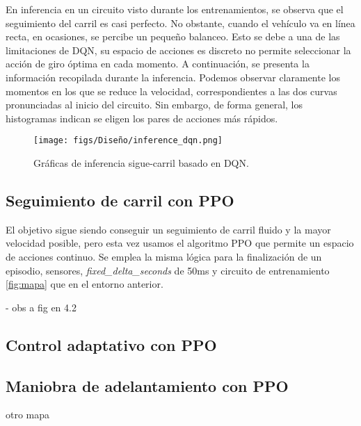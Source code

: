 En inferencia en un circuito visto durante los entrenamientos, se observa que el seguimiento del carril es casi perfecto. No obstante, cuando el vehículo va en línea recta, en ocasiones, se percibe un pequeño balanceo. Esto se debe a una de las limitaciones de \ac{DQN}, su espacio de acciones es discreto no permite seleccionar la acción de giro óptima en cada momento. A continuación, se presenta la información recopilada durante la inferencia. Podemos observar claramente los momentos en los que se reduce la velocidad, correspondientes a las dos curvas pronunciadas al inicio del circuito. Sin embargo, de forma general, los histogramas indican se eligen los pares de acciones más rápidos.
\begin{figure}[ht]
  \centering
  \texttt{[image: figs/Diseño/inference\_dqn.png]}
  \caption{Gráficas de inferencia sigue-carril basado en \ac{DQN}.}
  \label{fig:inference_dqn}
\end{figure}

\subsection{Seguimiento de carril con PPO}

El objetivo sigue siendo conseguir un seguimiento de carril fluido y la mayor velocidad posible, pero esta vez usamos el algoritmo \ac{PPO} que permite un espacio de acciones continuo. Se emplea la misma lógica para la finalización de un episodio, sensores, \textit{fixed\_delta\_seconds} de 50ms y circuito de entrenamiento \ref{fig:mapa} que en el entorno anterior.

- obs a fig en 4.2

\subsection{Control adaptativo con PPO}

\subsection{Maniobra de adelantamiento con PPO}

otro mapa